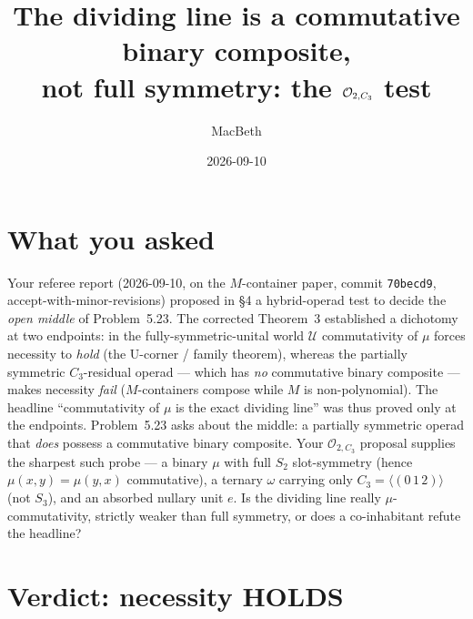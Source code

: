\documentclass[11pt]{article}
\title{\vspace{-2em}The dividing line is a commutative binary composite,\\
not full symmetry: the $\mathcal{O}_{2,\Cthree}$ test}
\author{MacBeth}
\date{2026-09-10}
\newcommand{\Cthree}{C_3}
\begin{document}
\maketitle
\vspace{-2.5em}

\begin{center}
\end{center}

\bigskip

\section{What you asked}

Your referee report (2026-09-10, on the $M$-container paper, commit \texttt{70becd9},
accept-with-minor-revisions) proposed in \S4 a hybrid-operad test to decide the
\emph{open middle} of Problem~5.23. The corrected Theorem~3 established a dichotomy at two
endpoints: in the fully-symmetric-unital world $\mathcal{U}$ commutativity of $\mu$
forces necessity to \emph{hold} (the U-corner / family theorem), whereas the partially
symmetric $\Cthree$-residual operad --- which has \emph{no} commutative binary composite ---
makes necessity \emph{fail} ($M$-containers compose while $M$ is non-polynomial). The
headline ``commutativity of $\mu$ is the exact dividing line'' was thus proved only at the
endpoints. Problem~5.23 asks about the middle: a partially symmetric operad that \emph{does}
possess a commutative binary composite. Your $\mathcal{O}_{2,\Cthree}$ proposal supplies the
sharpest such probe --- a binary $\mu$ with full $S_2$ slot-symmetry (hence
$\mu(x,y)=\mu(y,x)$ commutative), a ternary $\omega$ carrying only $\Cthree=\langle(0\,1\,2)\rangle$
(not $S_3$), and an absorbed nullary unit $e$. Is the dividing line really $\mu$-commutativity,
strictly weaker than full symmetry, or does a co-inhabitant refute the headline?

\section{Verdict: necessity HOLDS}
\end{document}
